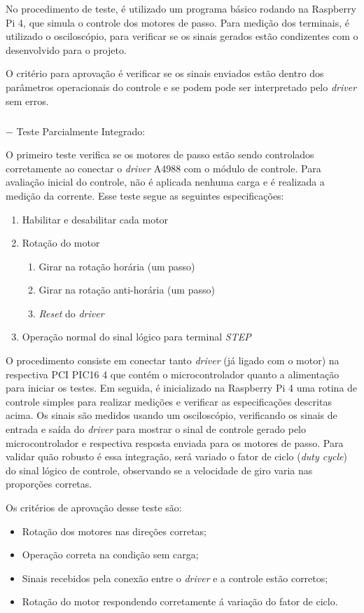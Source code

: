 No procedimento de teste, é utilizado um programa básico rodando na Raspberry Pi 4, que simula o controle dos motores de passo. Para medição dos terminais, é utilizado o osciloscópio, para verificar se os sinais gerados estão condizentes com o desenvolvido para o projeto. 

O critério para aprovação é verificar se os sinais enviados estão dentro dos parâmetros operacionais do controle e se podem pode ser interpretado pelo \textit{driver} sem erros.

\subparagraph*{} $-$ Teste Parcialmente Integrado:\label{sec:teste_parc_int}

O primeiro teste verifica se os motores de passo estão sendo controlados corretamente ao conectar o \textit{driver} A4988 com o módulo de controle. Para avaliação inicial do controle, não é aplicada nenhuma carga e é realizada a medição da corrente. Esse teste segue as seguintes especificações:

\begin{enumerate}
    \item Habilitar e desabilitar cada motor
    \item Rotação do motor
    \begin{enumerate}
        \item Girar na rotação horária (um passo)
        \item Girar na rotação anti-horária (um passo)
        \item \textit{Reset} do \textit{driver}
    \end{enumerate}
    \item Operação normal do sinal lógico para terminal \textit{STEP}
\end{enumerate}

O procedimento consiste em conectar tanto \textit{driver} (já ligado com o motor) na respectiva PCI PIC16 4 que contém o microcontrolador quanto a alimentação para iniciar os testes. Em seguida, é inicializado na Raspberry Pi 4 uma rotina de controle simples para realizar medições e verificar as especificações descritas acima. Os sinais são medidos usando um osciloscópio, verificando os sinais de entrada e saída do \textit{driver} para mostrar o sinal de controle gerado pelo microcontrolador e respectiva resposta enviada para os motores de passo.  Para validar quão robusto é essa integração, será variado o fator de ciclo (\textit{duty cycle}) do sinal lógico de controle, observando se a velocidade de giro varia nas proporções corretas. 

Os critérios de aprovação desse teste são:
\begin{itemize}
    \item Rotação dos motores nas direções corretas;
    \item Operação correta na condição sem carga;
    \item Sinais recebidos pela conexão entre o \textit{driver} e a controle estão corretos;
    \item Rotação do motor respondendo corretamente á variação do fator de ciclo. 
\end{itemize}


